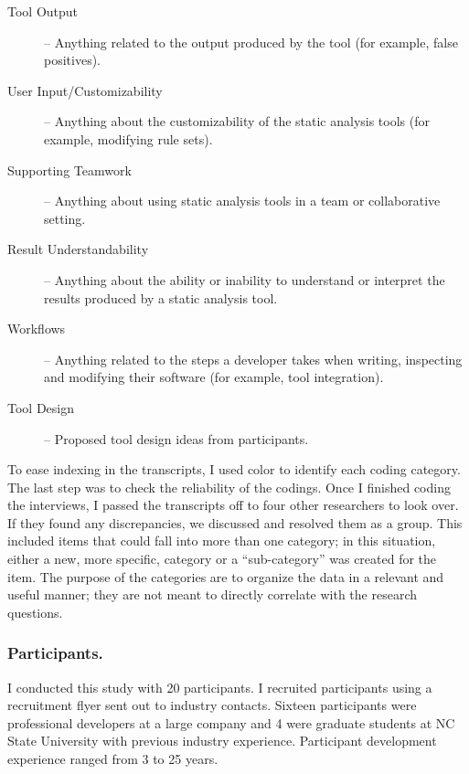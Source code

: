 \documentclass{llncs}
\begin{document}
\begin{description}
	\item[Tool Output] -- Anything related to the output produced by the tool (for example, false positives). 
	\item[User Input/Customizability] -- Anything about the customizability of the static analysis tools (for example, modifying rule sets). 
	\item[Supporting Teamwork] -- Anything about using static analysis tools in a team or collaborative setting. 
	\item[Result Understandability] -- Anything about the ability or inability to understand or interpret the results produced by a static analysis tool.
	\item[Workflows] -- Anything related to the steps a developer takes when writing, inspecting and modifying their software (for example, tool integration).
	\item[Tool Design] -- Proposed tool design ideas from participants.
\end{description}

To ease indexing in the transcripts, I used color to identify each coding category.
The last step was to check the reliability of the codings. Once I finished coding the interviews, I passed the transcripts off to four other researchers to look over. If they found any discrepancies, we discussed and resolved them as a group. This included items that could fall into more than one category; in this situation, either a new, more specific, category or a ``sub-category'' was created for the item. The purpose of the categories are to organize the data in a relevant and useful manner; they are not meant to directly correlate with the research questions.

\subsubsection{Participants.} I conducted this study with 20 participants. I recruited participants using a recruitment flyer sent out to industry contacts. Sixteen participants were professional developers at a large company and 4 were graduate students at NC State University with previous industry experience. Participant development experience ranged from 3 to 25 years.
\end{document}
